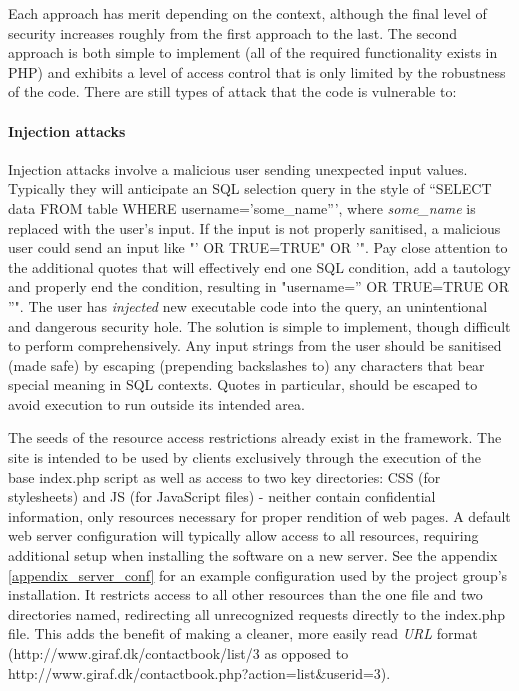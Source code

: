 Each approach has merit depending on the context, although the final level of security increases roughly from the first approach to the last. The second approach is both simple to implement (all of the required functionality exists in PHP) and exhibits a level of access control that is only limited by the robustness of the code. There are still types of attack that the code is vulnerable to:

\paragraph*{Injection attacks}
Injection attacks involve a malicious user sending unexpected input values. Typically they will anticipate an SQL selection query in the style of ``SELECT data FROM table WHERE username='some\_name''', where \emph{some\_name} is replaced with the user's input. If the input is not properly sanitised, a malicious user could send an input like "' OR TRUE=TRUE" OR '". Pay close attention to the additional quotes that will effectively end one SQL condition, add a tautology and properly end the condition, resulting in "username='' OR TRUE=TRUE OR ''". The user has \emph{injected} new executable code into the query, an unintentional and dangerous security hole. The solution is simple to implement, though difficult to perform comprehensively. Any input strings from the user should be sanitised (made safe) by escaping (prepending backslashes to) any characters that bear special meaning in SQL contexts. Quotes in particular, should be escaped to avoid execution to run outside its intended area.

The seeds of the resource access restrictions already exist in the framework. The site is intended to be used by clients exclusively through the execution of the base index.php script as well as access to two key directories: CSS (for stylesheets) and JS (for JavaScript files) - neither contain confidential information, only resources necessary for proper rendition of web pages. A default web server configuration will typically allow access to all resources, requiring additional setup when installing the software on a new server. See the appendix \vref{appendix_server_conf} for an example configuration used by the project group's installation. It restricts access to all other resources than the one file and two directories named, redirecting all unrecognized requests directly to the index.php file. This adds the benefit of making a cleaner, more easily read \emph{URL} format (http://www.giraf.dk/contactbook/list/3 as opposed to http://www.giraf.dk/contactbook.php?action=list\&userid=3).

